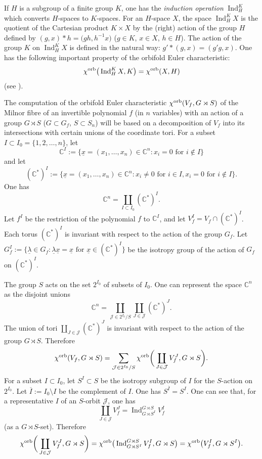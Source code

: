 \documentclass[pdftex]{sigma}
\numberwithin{equation}{section}
\begin{document}
If $H$ is a subgroup of a finite group $K$, one has the {\em induction operation} $\operatorname{Ind}_H^K$ which converts $H$-spaces to $K$-spaces. For an $H$-space $X$, the space $\operatorname{Ind}_H^K X$ is the quotient of the Cartesian product $K\times X$ by the (right) action of the group $H$ defined by $(g,x)*h=\big(gh, h^{-1}x\big)$ ($g\in K$, $x\in X$, $h\in H$). The action of the group $K$ on $\operatorname{Ind}_H^K X$ is defined in the natural way: $g'*(g,x)=(g'g,x)$. One has the following important property of the orbifold Euler characteristic:
\[
{\chi}^{\rm orb}\big(\operatorname{Ind}_H^K X, K\big)={\chi}^{\rm orb}(X, H)
\]
(see \cite[Theorem~1]{GLM}).

The computation of the orbifold Euler characteristic ${\chi}^{\rm orb}(V_f, G \rtimes S)$ of the Milnor fibre of an invertible polynomial $f$ (in $n$ variables) with an action of a group $G\rtimes S$ ($G\subset G_f$, $S\subset S_n$) will be based on a decomposition of $V_f$ into its intersections with certain unions of the coordinate tori. For a subset $I\subset I_0=\{1, 2, \dots, n\}$, let
\[
{\mathbb C}^I:=\big\{\underline{x}=(x_1, \dots, x_n)\in {\mathbb C}^n\colon x_i=0 \text{ for }i\notin I\big\}
\]
and let
\[
({\mathbb C}^*)^I:=\big\{\underline{x}=(x_1, \dots, x_n)\in {\mathbb C}^n\colon x_i\neq 0 \text{ for }i\in I, x_i=0 \text{ for }i\notin I\big\} .
\]
One has
\[
{\mathbb C}^n=\coprod_{I\subset I_0} ({\mathbb C}^*)^I.
\]
Let $f^I$ be the restriction of the polynomial $f$ to ${\mathbb C}^I$, and let $V_f^I=V_f \cap ({\mathbb C}^*)^I$.
Each torus $({\mathbb C}^\ast)^I$ is invariant with respect to the action of the group $G_f$.
Let $G_f^I:=\big\{ \underline{\lambda} \in G_f \colon \underline{\lambda} \underline{x} =
\underline{x} \mbox{ for } \underline{x} \in ({\mathbb C}^\ast)^I \big\}$ be the isotropy group of the action of $G_f$ on $({\mathbb C}^\ast)^I$.

The group $S$ acts on the set $2^{I_0}$ of subsets of $I_0$. One can represent the space ${\mathbb C}^n$ as the disjoint unions
\[
{\mathbb C}^n=\coprod_{{\mathcal J}\in 2^{I_0}/S}\coprod_{J\in{\mathcal J}}({\mathbb C}^*)^J.
\]
The union of tori $\coprod_{J\in{\mathcal J}}({\mathbb C}^*)^J$ is invariant with respect to the action of the group $G \rtimes S$. Therefore
\[
{\chi}^{\rm orb}(V_f, G \rtimes S)=\sum_{{\mathcal J}\in 2^{I_0}/S}{\chi}^{\rm orb}\bigg(\coprod_{J\in{\mathcal J}}V_f^J, G \rtimes S\bigg) .
\]
For a subset $I\subset I_0$, let $S^I\subset S$ be the isotropy subgroup of $I$ for the $S$-action on $2^{I_0}$. Let $\overline{I} := I_0 \setminus I$ be the complement of $I$. One has $S^{\overline{I}}=S^I$.
One can see that, for a representative $I$ of an $S$-orbit ${\mathcal J}$, one has
\[
\coprod_{J\in{\mathcal J}}V_f^J=\operatorname{Ind}_{G\rtimes S^I}^{G\rtimes S} V_f^I
\]
(as a $G\rtimes S$-set). Therefore
\[
{\chi}^{\rm orb}\bigg(\coprod_{J\in{\mathcal J}}V_f^J,G \rtimes S\bigg)=
{\chi}^{\rm orb}\big(\operatorname{Ind}_{G\rtimes S^I}^{G\rtimes S} V_f^I, G\rtimes S\big)=
{\chi}^{\rm orb}\big(V_f^I, G\rtimes S^I\big).
\]
\end{document}
